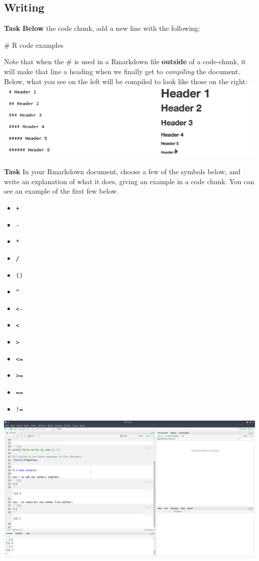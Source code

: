 \documentclass[]{book}
\providecommand{\tightlist}{%
  \setlength{\itemsep}{0pt}\setlength{\parskip}{0pt}}
\begin{document}
\hypertarget{writing}{%
\subsection*{Writing}\label{writing}}

\textbf{Task}
\textbf{Below} the code chunk, add a new line with the following:

\# R code examples

Note that when the \# is used in a Rmarkdown file \textbf{outside} of a code-chunk, it will make that line a heading when we finally get to \emph{compiling} the document. Below, what you see on the left will be compiled to look like those on the right:\\
\includegraphics{images/installing_intro/headings.png}

\textbf{Task}
In your Rmarkdown document, choose a few of the symbols below, and write an explanation of what it does, giving an example in a code chunk. You can see an example of the first few below.

\begin{itemize}
\tightlist
\item
  \texttt{+}
\item
  \texttt{-}
\item
  \texttt{*}
\item
  \texttt{/}
\item
  \texttt{()}
\item
  \texttt{\^{}}
\item
  \texttt{\textless{}-}
\item
  \texttt{\textless{}}
\item
  \texttt{\textgreater{}}
\item
  \texttt{\textless{}=}
\item
  \texttt{\textgreater{}=}
\item
  \texttt{==}
\item
  \texttt{!=}
\end{itemize}

\includegraphics{images/installing_intro/ss_examples.png}
\end{document}
